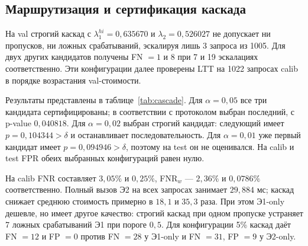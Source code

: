 \documentclass{misisarticle}
\begin{document}
\subsection{Маршрутизация и сертификация каскада}

На val строгий каскад с $\lambda_1^{hi}=0{,}635670$ и $\lambda_2=0{,}526027$ не допускает ни пропусков, ни ложных срабатываний, эскалируя лишь 3 запроса из 1005. Для двух других кандидатов получены FN $=1$ и $8$ при 7 и 19 эскалациях соответственно. Эти конфигурации далее проверены LTT на 1022 запросах calib в порядке возрастания val-стоимости.

Результаты представлены в таблице~\ref{tab:cascade}. Для $\alpha=0{,}05$ все три кандидата сертифицированы; в соответствии с протоколом выбран последний, с p-value $0{,}040818$. Для $\alpha=0{,}02$ выбран строгий кандидат: следующий имеет $p=0{,}104344>\delta$ и останавливает последовательность. Для $\alpha=0{,}01$ уже первый кандидат имеет $p=0{,}094946>\delta$, поэтому на test он не оценивался. На calib и test FPR обеих выбранных конфигураций равен нулю.

\begin{table}[t]
  \caption{Калибровка каскада и повторная диагностика на own test}
  \label{tab:cascade}
  \centering
\end{table}

На calib FNR составляет $3{,}05\%$ и $0{,}25\%$, FNR$_w$ --- $2{,}36\%$ и $0{,}0786\%$ соответственно. Полный вызов Э2 на всех запросах занимает $29{,}884$ мс; каскад снижает среднюю стоимость примерно в $18{,}1$ и $35{,}3$ раза. При этом Э1-only дешевле, но имеет другое качество: строгий каскад при одном пропуске устраняет 7 ложных срабатываний Э1 при пороге $0{,}5$. Для конфигурации 5\% каскад даёт FN $=12$ и FP $=0$ против FN $=28$ у Э1-only и FN $=31$, FP $=9$ у Э2-only.
\end{document}
